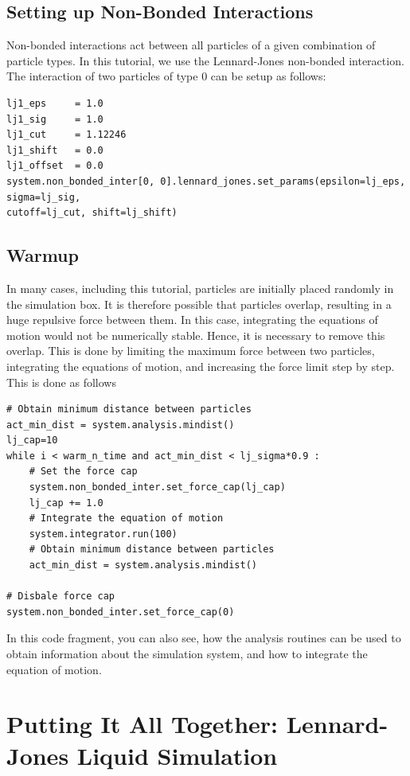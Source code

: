 \documentclass[
paper=a4,                       %
fontsize=11pt,                  %
twoside,                        %
footsepline,                    %
headsepline,                    %
headinclude=false,              %
footinclude=false,              %
pagesize,                       %
]{scrartcl}
\begin{document}
\subsection{Setting up Non-Bonded Interactions}

Non-bonded interactions act between all particles of a given combination of particle types.
In this tutorial, we use the Lennard-Jones non-bonded interaction.
The interaction of two particles of type 0 can be setup as follows:
{\small\vspace{0,2cm}
\begin{lstlisting}
lj1_eps     = 1.0
lj1_sig     = 1.0
lj1_cut     = 1.12246
lj1_shift   = 0.0
lj1_offset  = 0.0
system.non_bonded_inter[0, 0].lennard_jones.set_params(epsilon=lj_eps, sigma=lj_sig,
cutoff=lj_cut, shift=lj_shift)
\end{lstlisting}
}\vspace{0,2cm}


\subsection{Warmup}

In many cases, including this tutorial, particles are initially placed randomly in the simulation box. It is therefore possible that particles overlap, resulting in a huge repulsive force between them. In this case, integrating the equations of motion would not be numerically stable. Hence, it is necessary to remove this overlap.
This is done by limiting the maximum force between two particles, integrating the equations of motion, and increasing the force limit step by step.
This is done as follows
\begin{lstlisting}
# Obtain minimum distance between particles
act_min_dist = system.analysis.mindist()
lj_cap=10
while i < warm_n_time and act_min_dist < lj_sigma*0.9 :
    # Set the force cap
    system.non_bonded_inter.set_force_cap(lj_cap)
    lj_cap += 1.0
    # Integrate the equation of motion
    system.integrator.run(100)
    # Obtain minimum distance between particles
    act_min_dist = system.analysis.mindist()

# Disbale force cap
system.non_bonded_inter.set_force_cap(0)
\end{lstlisting}
In this code fragment, you can also see, how the analysis routines can be used to obtain information about the simulation system, and how to integrate the equation of motion.


\section{Putting It All Together: Lennard-Jones Liquid Simulation}
\end{document}
